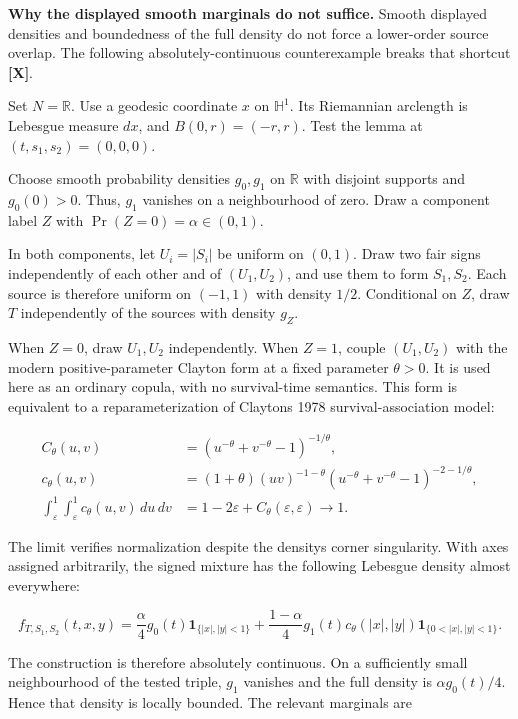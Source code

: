 \documentclass[
  11pt,
  a4paper,
]{article}
\begin{document}
\textbf{Why the displayed smooth marginals do not suffice.} Smooth
displayed densities and boundedness of the full density do not force a
lower-order source overlap. The following absolutely-continuous
counterexample breaks that shortcut \textbf{{[}X{]}}.

Set \(N=\mathbb R\). Use a geodesic coordinate \(x\) on \(\mathbb H^1\).
Its Riemannian arclength is Lebesgue measure \(dx\), and
\(B(0,r)=(-r,r)\). Test the lemma at \((t,s_1,s_2)=(0,0,0)\).

Choose smooth probability densities \(g_0,g_1\) on \(\mathbb R\) with
disjoint supports and \(g_0(0)>0\). Thus, \(g_1\) vanishes on a
neighbourhood of zero. Draw a component label \(Z\) with
\(\Pr(Z=0)=\alpha\in(0,1)\).

In both components, let \(U_i=|S_i|\) be uniform on \((0,1)\). Draw two
fair signs independently of each other and of \((U_1,U_2)\), and use
them to form \(S_1,S_2\). Each source is therefore uniform on \((-1,1)\)
with density \(1/2\). Conditional on \(Z\), draw \(T\) independently of
the sources with density \(g_Z\).


When \(Z=0\), draw \(U_1,U_2\) independently. When \(Z=1\), couple
\((U_1,U_2)\) with the modern positive-parameter Clayton form at a fixed
parameter \(\theta>0\). It is used here as an ordinary copula, with no
survival-time semantics. This form is equivalent to a reparameterization
of Clayton\textquotesingle s 1978 survival-association model:

\[
\begin{aligned}
C_\theta(u,v)&=(u^{-\theta}+v^{-\theta}-1)^{-1/\theta},\\
c_\theta(u,v)&=(1+\theta)(uv)^{-1-\theta}
(u^{-\theta}+v^{-\theta}-1)^{-2-1/\theta},\\
\int_\varepsilon^1\!\int_\varepsilon^1 c_\theta(u,v)\,du\,dv
&=1-2\varepsilon+C_\theta(\varepsilon,\varepsilon)\longrightarrow1.
\end{aligned}
\]

The limit verifies normalization despite the density\textquotesingle s
corner singularity. With axes assigned arbitrarily, the signed mixture
has the following Lebesgue density almost everywhere:

\[
f_{T,S_1,S_2}(t,x,y)=
\frac{\alpha}{4}g_0(t)\mathbf 1_{\{|x|,|y|<1\}}
+\frac{1-\alpha}{4}g_1(t)c_\theta(|x|,|y|)
\mathbf 1_{\{0<|x|,|y|<1\}}.
\]

The construction is therefore absolutely continuous. On a sufficiently
small neighbourhood of the tested triple, \(g_1\) vanishes and the full
density is \(\alpha g_0(t)/4\). Hence that density is locally bounded.
The relevant marginals are
\end{document}
